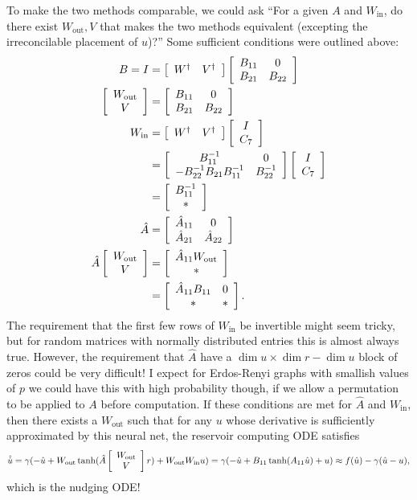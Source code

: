 \documentclass{article}
\newcommand{\mat}[2]{
    \IfInteger{#1}{
        \left[\begin{array}{*{#1}c} #2 \end{array}\right]
    }{
        \left[\begin{array}{#1} #2 \end{array}\right]}
    }
\newcommand{\Wout}{W_{\text{out}}}
\newcommand{\Win}{W_{\text{in}}}
\begin{document}
To make the two methods comparable, we could ask ``For a given $A$ and $\Win$, do there exist $\Wout, V$ that makes the two methods equivalent (excepting the irreconcilable placement of $u$)?'' Some sufficient conditions were outlined above:
\begin{align*}
    B = I &= \mat{2}{W^\dagger & V^\dagger}\mat{2}{B_{11} & 0 \\ B_{21} & B_{22}}
    \\
    \mat{1}{\Wout \\ V} &= \mat{2}{B_{11} & 0 \\ B_{21} & B_{22}}
    \\
    \Win &= \mat{2}{W^\dagger & V^\dagger} \mat{1}{I \\ C_7}
    \\
    &= \mat{2}{B_{11}^{-1} & 0 \\ -B_{22}^{-1}B_{21}B_{11}^{-1} & B_{22}^{-1}}\mat{1}{I \\ C_7}
    \\
    &= \mat{1}{B_{11}^{-1} \\ *}
    \\
    \hat A &= \mat{2}{\hat A_{11} & 0 \\ \hat A_{21} & \hat A_{22}}
    \\
    \hat A \mat{1}{\Wout \\ V}&= \mat{2}{\hat A_{11}\Wout \\ *}
    \\
    &= \mat{2}{\hat A_{11}B_{11} & 0 \\ * & *}.
\end{align*}
The requirement that the first few rows of $\Win$ be invertible might seem tricky, but for random matrices with normally distributed entries this is almost always true. However, the requirement that $\hat {A}$ have a $\dim u \times \dim r - \dim u$ block of zeros could be very difficult! I expect for Erdos-Renyi graphs with smallish values of $p$ we could have this with high probability though, if we allow a permutation to be applied to $A$ before computation. If these conditions are met for $\hat A$ and $\Win$, then there exists a $\Wout$ such that for any $u$ whose derivative is sufficiently approximated by this neural net, the reservoir computing ODE satisfies 
\[
\hat{\dot u} = \gamma (-\hat u + \Wout \tanh(\hat A\mat{1}{\Wout\\V} r) + \Wout\Win u) =  \gamma (-\hat u + B_{11} \tanh (A_{11} \hat u) + u) \approx f(\hat u) - \gamma (\hat u - u),
\]
which is the nudging ODE!
\end{document}
